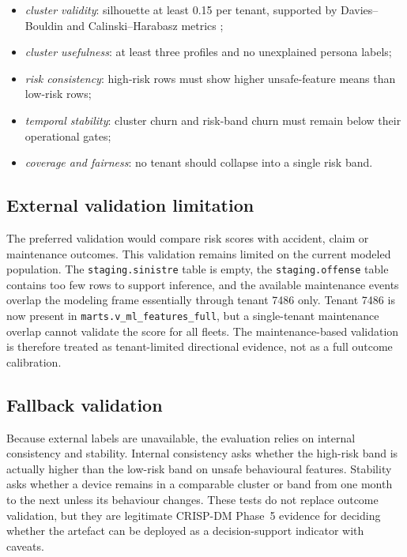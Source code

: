\begin{itemize}
    \item \emph{cluster validity}: silhouette at least 0.15 per tenant, supported by Davies--Bouldin and Calinski--Harabasz metrics \cite{rousseeuw1987silhouettes,davies1979cluster,calinski1974dendrite};
    \item \emph{cluster usefulness}: at least three profiles and no unexplained persona labels;
    \item \emph{risk consistency}: high-risk rows must show higher unsafe-feature means than low-risk rows;
    \item \emph{temporal stability}: cluster churn and risk-band churn must remain below their operational gates;
    \item \emph{coverage and fairness}: no tenant should collapse into a single risk band.
\end{itemize}

\subsection{External validation limitation}
The preferred validation would compare risk scores with accident, claim or maintenance outcomes. This validation remains limited on the current modeled population. The \texttt{staging.sinistre} table is empty, the \texttt{staging.offense} table contains too few rows to support inference, and the available maintenance events overlap the modeling frame essentially through tenant 7486 only. Tenant 7486 is now present in \texttt{marts.v\_ml\_features\_full}, but a single-tenant maintenance overlap cannot validate the score for all fleets. The maintenance-based validation is therefore treated as tenant-limited directional evidence, not as a full outcome calibration.

\subsection{Fallback validation}
Because external labels are unavailable, the evaluation relies on internal consistency and stability. Internal consistency asks whether the high-risk band is actually higher than the low-risk band on unsafe behavioural features. Stability asks whether a device remains in a comparable cluster or band from one month to the next unless its behaviour changes. These tests do not replace outcome validation, but they are legitimate CRISP-DM Phase~5 evidence for deciding whether the artefact can be deployed as a decision-support indicator with caveats.


